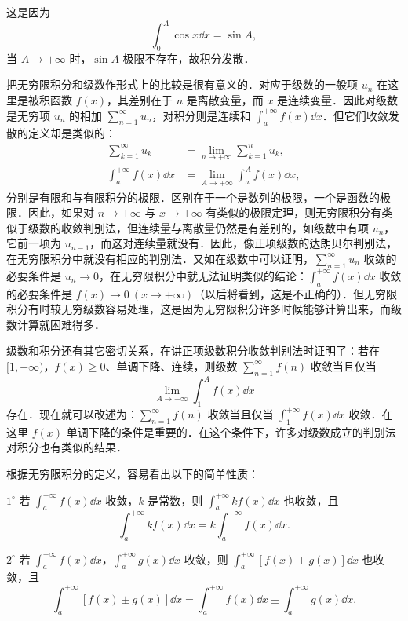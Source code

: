这是因为
\[
\int_{0}^{A}\cos x\dd x=\sin A,
\]
当 $A\to+\infty$ 时，$\sin A$ 极限不存在，故积分发散．

把无穷限积分和级数作形式上的比较是很有意义的．对应于级数的一般项 $u_{n}$ 在这里是被积函数 $f(x)$，其差别在于 $n$ 是离散变量，而 $x$ 是连续变量．因此对级数是无穷项 $u_{n}$ 的相加 $\displaystyle\sum_{n=1}^{\infty}u_{n}$，对积分则是连续和 $\displaystyle\int_{a}^{+\infty}f(x)\dd x$．但它们收敛发散的定义却是类似的：
\[
\begin{aligned}
\sum_{k=1}^{\infty}u_{k}&=\lim_{n\to+\infty}\sum_{k=1}^{n}u_{k},\\
\int_{a}^{+\infty}f(x)\dd x&=\lim_{A\to+\infty}\int_{a}^{A}f(x)\dd x,
\end{aligned}
\]
分别是有限和与有限积分的极限．区别在于一个是数列的极限，一个是函数的极限．因此，如果对 $n\to+\infty$ 与 $x\to+\infty$ 有类似的极限定理，则无穷限积分有类似于级数的收敛判别法，但连续量与离散量仍然是有差别的，如级数中有项 $u_{n}$，它前一项为 $u_{n-1}$，而这对连续量就没有．因此，像正项级数的达朗贝尔判别法，在无穷限积分中就没有相应的判别法．又如在级数中可以证明，$\displaystyle\sum_{n=1}^{\infty}u_{n}$ 收敛的必要条件是 $u_{n}\to 0$，在无穷限积分中就无法证明类似的结论：$\displaystyle\int_{a}^{+\infty}f(x)\dd x$ 收敛的必要条件是 $f(x)\to 0\ (x\to+\infty)$（以后将看到，这是不正确的）．但无穷限积分有时较无穷级数容易处理，这是因为无穷限积分许多时候能够计算出来，而级数计算就困难得多．

级数和积分还有其它密切关系，在讲正项级数积分收敛判别法时证明了：若在 $[1,+\infty)$，$f(x)\geqslant 0$、单调下降、连续，则级数 $\displaystyle\sum_{n=1}^{\infty}f(n)$ 收敛当且仅当
\[
\lim_{A\to+\infty}\int_{1}^{A}f(x)\dd x
\]
存在．现在就可以改述为：$\displaystyle\sum_{n=1}^{\infty}f(n)$ 收敛当且仅当 $\displaystyle\int_{1}^{+\infty}f(x)\dd x$ 收敛．在这里 $f(x)$ 单调下降的条件是重要的．在这个条件下，许多对级数成立的判别法对积分也有类似的结果．

根据无穷限积分的定义，容易看出以下的简单性质：

$1^{\circ}$ 若 $\displaystyle\int_{a}^{+\infty}f(x)\dd x$ 收敛，$k$ 是常数，则 $\displaystyle\int_{a}^{+\infty}kf(x)\dd x$ 也收敛，且
\[
\int_{a}^{+\infty}kf(x)\dd x=k\int_{a}^{+\infty}f(x)\dd x.
\]

$2^{\circ}$ 若 $\displaystyle\int_{a}^{+\infty}f(x)\dd x$，$\displaystyle\int_{a}^{+\infty}g(x)\dd x$ 收敛，则 $\displaystyle\int_{a}^{+\infty}\left[f(x)\pm g(x)\right]\dd x$ 也收敛，且
\[
\int_{a}^{+\infty}\left[f(x)\pm g(x)\right]\dd x=\int_{a}^{+\infty}f(x)\dd x\pm\int_{a}^{+\infty}g(x)\dd x.
\]

